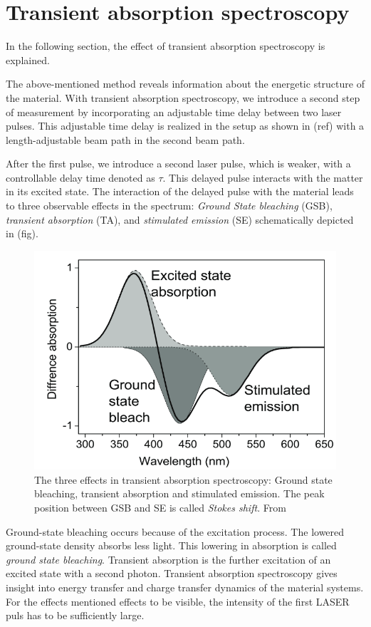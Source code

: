 \section{Transient absorption spectroscopy}
\label{sec:TheoTransAbs} 

In the following section, the effect of transient absorption spectroscopy is explained. 

The above-mentioned method reveals information about the energetic structure of the material. With transient absorption spectroscopy, we introduce a second step of measurement by incorporating an adjustable time delay between two laser pulses. This adjustable time delay is realized in the setup as shown in (ref) with a length-adjustable beam path in the second beam path.
 
After the first pulse, we introduce a second laser pulse, which is weaker, with a controllable delay time denoted as $\tau$. This delayed pulse interacts with the matter in its excited state. The interaction of the delayed pulse with the material leads to three observable effects in the spectrum: \textit{Ground State bleaching} (GSB), \textit{transient absorption} (TA), and \textit{stimulated emission} (SE) schematically depicted in (fig). 
\begin{figure}[ht]
    \centering
    \includegraphics[width = 12cm]{Bilder/Grundlagen/GSBSETA.png}
    \caption{The three effects in transient absorption spectroscopy: Ground state bleaching, transient absorption and stimulated emission. The peak position between GSB and SE is called \textit{Stokes shift}. From \cite{5796fb6fae874c3fb73b57f57c942314}}
    \label{fig:GSBSETRA}
\end{figure}
Ground-state bleaching occurs because of the excitation process. The lowered ground-state density absorbs less light. This lowering in absorption is called \textit{ground state bleaching}. Transient absorption is the further excitation of an excited state with a second photon. 
Transient absorption spectroscopy gives insight into energy transfer and charge transfer dynamics of the material systems. For the effects mentioned effects to be visible, the intensity of the first LASER puls has to be 
sufficiently large.


